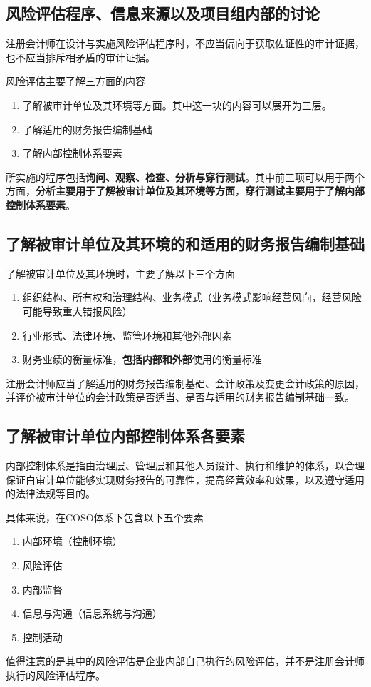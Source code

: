 \documentclass[UTF8,12pt]{ctexart}
\numberwithin{equation}{section} %
\numberwithin{figure}{section}
\numberwithin{table}{section}
\begin{document}
	
	\subsection{风险评估程序、信息来源以及项目组内部的讨论}
	注册会计师在设计与实施风险评估程序时，不应当偏向于获取佐证性的审计证据，也不应当排斥相矛盾的审计证据。
	
	风险评估主要了解三方面的内容
	\begin{enumerate}
		\item 了解被审计单位及其环境等方面。其中这一块的内容可以展开为三层。
		
		\item 了解适用的财务报告编制基础
		
		\item 了解内部控制体系要素
	\end{enumerate}
	
	所实施的程序包括\textbf{询问、观察、检查、分析与穿行测试}。其中前三项可以用于两个方面，\textbf{分析主要用于了解被审计单位及其环境等方面}，\textbf{穿行测试主要用于了解内部控制体系要素}。
	
	\subsection{了解被审计单位及其环境的和适用的财务报告编制基础}
	了解被审计单位及其环境时，主要了解以下三个方面
	\begin{enumerate}
		\item 组织结构、所有权和治理结构、业务模式（业务模式影响经营风向，经营风险可能导致重大错报风险）
		
		\item 行业形式、法律环境、监管环境和其他外部因素
		
		\item 财务业绩的衡量标准，\textbf{包括内部和外部}使用的衡量标准
	\end{enumerate}
	
	注册会计师应当了解适用的财务报告编制基础、会计政策及变更会计政策的原因，并评价被审计单位的会计政策是否适当、是否与适用的财务报告编制基础一致。
	
	\subsection{了解被审计单位内部控制体系各要素}
	内部控制体系是指由治理层、管理层和其他人员设计、执行和维护的体系，以合理保证白审计单位能够实现财务报告的可靠性，提高经营效率和效果，以及遵守适用的法律法规等目的。
	
	具体来说，在COSO体系下包含以下五个要素
	\begin{enumerate}
		\item 内部环境（控制环境）
		
		\item 风险评估
		
		\item 内部监督
		
		\item 信息与沟通（信息系统与沟通）
		
		\item 控制活动
	\end{enumerate}
	值得注意的是其中的风险评估是企业内部自己执行的风险评估，并不是注册会计师执行的风险评估程序。
	
\end{document}
